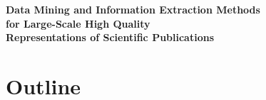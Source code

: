 \documentclass[en,16:9,smallfoot]{sdqbeamer}
\begin{document}
   \begin{frame}[plain]
        \vspace{1cm}
        \centering
        \begin{Large}
        \textbf{Data Mining and Information Extraction Methods}\\
        \vspace{0.25em}
        {\color{lightgrey}\textbf{for Large-Scale High Quality}}\\
        \vspace{0.5em}
        {\color{lightgrey}\textbf{Representations of Scientific Publications}}
        \end{Large}
   \end{frame}

\section{Outline}
\end{document}
